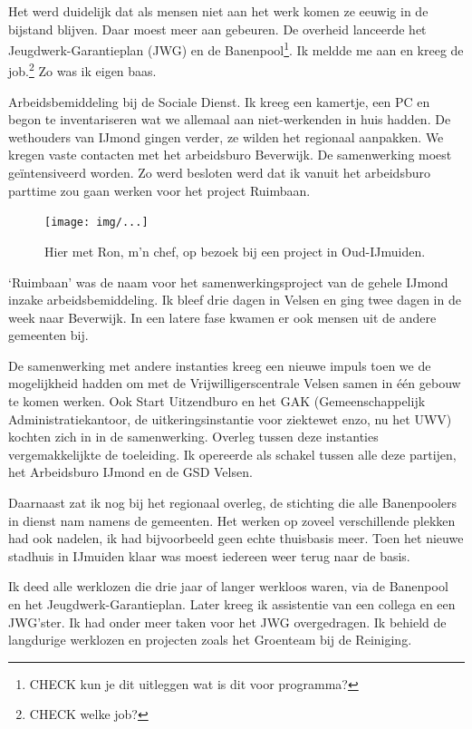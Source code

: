 \documentclass[12pt,twoside]{memoir}
\begin{document}
Het werd duidelijk dat als mensen niet aan het werk komen ze eeuwig in de bijstand blijven. Daar moest meer aan gebeuren. De overheid lanceerde het Jeugdwerk-Garantieplan (JWG) en de Banenpool\footnote{CHECK kun je dit uitleggen wat is dit voor programma?}. Ik meldde me aan en kreeg de job.\footnote{CHECK welke job?} Zo was ik eigen baas. 

Arbeidsbemiddeling bij de Sociale Dienst. Ik kreeg een kamertje, een PC en begon te inventariseren wat we allemaal aan niet-werkenden in huis hadden. De wethouders van IJmond gingen verder, ze wilden het regionaal aanpakken. We kregen vaste contacten met het arbeidsburo Beverwijk. De samenwerking moest geïntensiveerd worden. Zo werd besloten werd dat ik vanuit het arbeidsburo parttime zou gaan werken voor het project Ruimbaan.

\begin{figure}[t]
\texttt{[image: img/...]}
\caption{Hier met Ron, m’n chef, op bezoek bij een project in Oud-IJmuiden.}
\end{figure}

`Ruimbaan' was de naam voor het samenwerkingsproject van de gehele IJmond inzake arbeidsbemiddeling. Ik bleef drie dagen in Velsen en ging twee dagen in de week naar Beverwijk. In een latere fase kwamen er ook mensen uit de andere gemeenten bij. 

De samenwerking met andere instanties kreeg een nieuwe impuls toen we de mogelijkheid hadden om met de Vrijwilligerscentrale Velsen samen in één gebouw te komen werken. Ook Start Uitzendburo en het GAK (Gemeenschappelijk Administratiekantoor, de uitkeringsinstantie voor ziektewet enzo, nu het UWV) kochten zich in in de samenwerking. Overleg tussen deze instanties vergemakkelijkte de toeleiding. Ik opereerde als schakel tussen alle deze partijen, het Arbeidsburo IJmond en de GSD Velsen. 

Daarnaast zat ik nog bij het regionaal overleg, de stichting die alle Banenpoolers in dienst nam namens de gemeenten. Het werken op zoveel verschillende plekken had ook nadelen, ik had bijvoorbeeld geen echte thuisbasis meer. Toen het nieuwe stadhuis in IJmuiden klaar was moest iedereen weer terug naar de basis. 

Ik deed alle werklozen die drie jaar of langer werkloos waren, via de Banenpool en het Jeugdwerk-Garantieplan. Later kreeg ik assistentie van een collega en een JWG’ster. Ik had onder meer taken voor het JWG overgedragen. Ik behield de langdurige werklozen en projecten zoals het Groenteam bij de Reiniging. 
\end{document}
